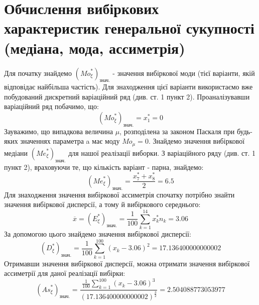 \documentclass{article}
\begin{document}
\section{Обчислення вибіркових характеристик генеральної 
сукупності (медіана, мода, ассиметрія)}
Для початку знайдемо $({Mo}_\xi^*)_{\text{знач.}}$ - 
значення вибіркової моди (тієї варіанти, якій відповідає 
найбільша частість). Для знаходження цієї варіанти використаємо
вже побудований дискретний варіаційний ряд (див. ст. 1 пункт 2).
Проаналізувавши варіаційний ряд побачимо, що:
$$({Mo}_\xi^*)_{\text{знач.}} = x_1^* = 0$$
Зауважимо, що випадкова величина $\mu$, розподілена за 
законом Паскаля при будь-яких значеннях параметра a
має моду ${Mo}_\mu = 0$.
\newline
\newline
Знайдемо значення вибіркової медіани $({Me}_\xi^*)_{\text{знач.}}$ 
для нашої реалізації виборки. З варіаційного ряду (див. ст. 1 
пункт 2), враховуючи те, що кількість варіант - парна, 
знайдемо:$$ ({Me}_\xi^*)_{\text{знач.}} = \frac{x_7^* + x_8^*}
{2} = 6.5 $$
\newline
Для знаходження значення вибіркової ассиметрія спочатку потрібно 
знайти значення вибіркової дисперсії, а тому й вибіркового середнього: 
$$\overline{x} = (E^*_{\xi})_{\text{знач.}} = \frac{1}{100} 
\sum_{k = 1}^{14} x_k^* n_k = 3.06$$
За допомогою цього знайдемо значення вибіркової дисперсії:
$$(D^*_{\xi})_{\text{знач.}} = \frac{1}{100} \sum_{k = 1}^{100}
(x_k - 3.06)^2 = 17.136400000000002$$
Отримавши значення вибіркової дисперсії, можна отримати значення
вибіркової ассиметрії для даної реалізації вибірки:
$$({As}_{\xi}^*)_{\text{знач.}} = \frac{\frac{1}{100}
\sum_{k = 1}^{100}(x_k - 3.06)^3}{(17.136400000000002)^
{\frac{3}{2}}} = 2.504088773053977$$
\end{document}
